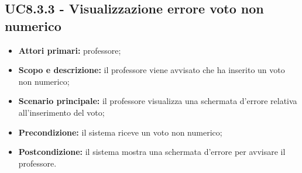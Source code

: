 \documentclass[AnalisiDeiRequisiti.tex]{subfiles}
\begin{document}
\subsection{UC8.3.3 - Visualizzazione errore voto non numerico}
\begin{itemize}
	\item \textbf{Attori primari:} professore;
	\item \textbf{Scopo e descrizione:} il professore viene avvisato che ha inserito un voto non numerico;
	\item \textbf{Scenario principale:} il professore visualizza una schermata d'errore relativa all'inserimento del voto;
	\item \textbf{Precondizione:} il sistema riceve un voto non numerico; 
	\item \textbf{Postcondizione:} il sistema mostra una schermata d'errore per avvisare il professore.
\end{itemize}
\end{document}
